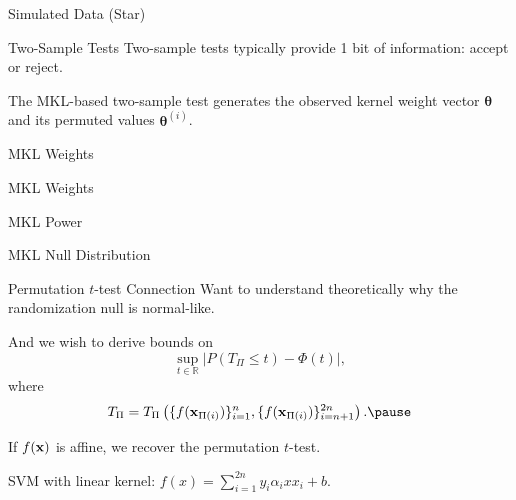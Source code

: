 \documentclass{beamer}
\begin{document}
\begin{frame}{Simulated Data (Star)}
  \begin{center}
    \resizebox{10.0cm}{!}{
      
    }
  \end{center}
\end{frame}

\begin{frame}{Two-Sample Tests}
  Two-sample tests typically provide 1 bit of information: accept or reject. \\ \pause

  The MKL-based two-sample test generates the observed kernel weight vector ${\boldsymbol \theta}$ and
  its permuted values ${\boldsymbol \theta}^{(i)}$.
\end{frame}

\begin{frame}{MKL Weights}
  \begin{center}
    \resizebox{10.0cm}{!}{
      
    }
  \end{center}
\end{frame}

\begin{frame}{MKL Weights}
  \begin{center}
    \resizebox{10.0cm}{!}{
      
    }
  \end{center}
\end{frame}

\begin{frame}{MKL Power}
  \begin{center}
    \resizebox{10.0cm}{!}{
      
    }
  \end{center}
\end{frame}

\begin{frame}{MKL Null Distribution}
  \begin{center}
    \resizebox{10.0cm}{!}{
      
    }
  \end{center}
\end{frame}

\begin{frame}{Permutation $t$-test Connection}
  Want to understand theoretically why the randomization null is normal-like. \pause

  And we wish to derive bounds on
  \begin{equation*}
    \sup_{t \in \mathbb{R}} |P(T_{\Pi} \leq t) - \Phi(t)|,
  \end{equation*}
  where
  \begin{equation*}
    T_{\Pi} = T_{\Pi} \left (\{f({\bf x}_{\Pi(i)})\}_{i=1}^{n}, \{f({\bf x}_{\Pi(i)})\}_{i=n+1}^{2n} \right). \pause
  \end{equation*}

  If $f({\bf x})$ is affine, we recover the permutation $t$-test. \pause

  SVM with linear kernel: $f(x) = \sum_{i=1}^{2n} y_i \alpha_i xx_i + b$.
\end{frame}
\end{document}
